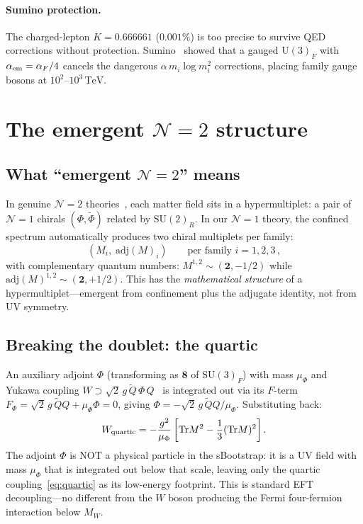 \documentclass[12pt,a4paper]{article}
\newcommand{\SU}{\mathrm{SU}}
\newcommand{\UU}{\mathrm{U}}
\newcommand{\Tr}{\mathrm{Tr}}
\newcommand{\adj}{\mathrm{adj}}
\newcommand{\TeV}{\,\mathrm{TeV}}
\begin{document}
\paragraph{Sumino protection.}
The charged-lepton $K = 0.666661$ ($0.001\%$) is too precise to
survive QED corrections without protection.
Sumino~\cite{Sumino:2009} showed that a gauged $\UU(3)_F$ with
$\alpha_{\rm em} = \alpha_F/4$ cancels the dangerous
$\alpha\,m_i\log m_i^2$ corrections, placing family gauge bosons
at $10^2$--$10^3\TeV$.


\section{The emergent $\mathcal{N}{=}2$ structure}
\label{sec:N2}

\subsection{What ``emergent $\mathcal{N}{=}2$'' means}

In genuine $\mathcal{N}{=}2$ theories~\cite{SeibergWitten:1994},
each matter field sits in a hypermultiplet: a pair of
$\mathcal{N}{=}1$ chirals $(\Phi, \tilde\Phi)$ related by
$\SU(2)_R$.
In our $\mathcal{N}{=}1$ theory, the confined spectrum
automatically produces two chiral multiplets per family:
\begin{equation}
  (M_i, \;\adj(M)_i)
  \qquad\text{per family } i = 1, 2, 3\,,
\end{equation}
with complementary quantum numbers:
$M^{1,2} \sim (\mathbf{2}, -1/2)$ while
$\adj(M)^{1,2} \sim (\mathbf{2}, +1/2)$.
This has the \emph{mathematical structure} of a
hypermultiplet---emergent from confinement plus the adjugate
identity, not from UV symmetry.


\subsection{Breaking the doublet: the quartic}

An auxiliary adjoint $\Phi$ (transforming as $\mathbf{8}$ of
$\SU(3)_F$) with mass $\mu_\Phi$ and Yukawa coupling
$W \supset \sqrt{2}\,g\,\tilde{Q}\,\Phi\,Q$~\cite{HMS:1997}
is integrated out via its $F$-term
$F_\Phi = \sqrt{2}\,g\,\tilde{Q}Q + \mu_\Phi\Phi = 0$,
giving $\Phi = -\sqrt{2}\,g\,\tilde{Q}Q/\mu_\Phi$.
Substituting back:
\begin{equation}
  W_{\rm quartic} = -\frac{g^2}{\mu_\Phi}
    \left[\Tr M^2
    - \frac{1}{3}(\Tr M)^2\right].
  \label{eq:quartic}
\end{equation}
The adjoint $\Phi$ is NOT a physical particle in the sBootstrap:
it is a UV field with mass $\mu_\Phi$ that is integrated out
below that scale, leaving only the quartic
coupling~\eqref{eq:quartic} as its low-energy footprint.
This is standard EFT decoupling---no different from the $W$
boson producing the Fermi four-fermion interaction below $M_W$.
\end{document}

